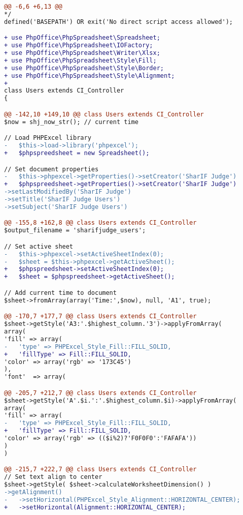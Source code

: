 \begin{lstlisting}[language=diff, basicstyle=\ttfamily, frame=single,
columns=fullflexible, keepspaces=true, breaklines=true]
@@ -6,6 +6,13 @@
*/
defined('BASEPATH') OR exit('No direct script access allowed');

+ use PhpOffice\PhpSpreadsheet\Spreadsheet;
+ use PhpOffice\PhpSpreadsheet\IOFactory;
+ use PhpOffice\PhpSpreadsheet\Writer\Xlsx;
+ use PhpOffice\PhpSpreadsheet\Style\Fill;
+ use PhpOffice\PhpSpreadsheet\Style\Border;
+ use PhpOffice\PhpSpreadsheet\Style\Alignment;
+ 
class Users extends CI_Controller
{

@@ -142,10 +149,10 @@ class Users extends CI_Controller
$now = shj_now_str(); // current time

// Load PHPExcel library
-   $this->load->library('phpexcel');
+   $phpspreedsheet = new Spreadsheet();

// Set document properties
-   $this->phpexcel->getProperties()->setCreator('SharIF Judge')
+   $phpspreedsheet->getProperties()->setCreator('SharIF Judge')
->setLastModifiedBy('SharIF Judge')
->setTitle('SharIF Judge Users')
->setSubject('SharIF Judge Users')

@@ -155,8 +162,8 @@ class Users extends CI_Controller
$output_filename = 'sharifjudge_users';

// Set active sheet
-   $this->phpexcel->setActiveSheetIndex(0);
-   $sheet = $this->phpexcel->getActiveSheet();
+   $phpspreedsheet->setActiveSheetIndex(0);
+   $sheet = $phpspreedsheet->getActiveSheet();

// Add current time to document
$sheet->fromArray(array('Time:',$now), null, 'A1', true);

@@ -170,7 +177,7 @@ class Users extends CI_Controller
$sheet->getStyle('A3:'.$highest_column.'3')->applyFromArray(
array(
'fill' => array(
-   'type' => PHPExcel_Style_Fill::FILL_SOLID,
+   'fillType' => Fill::FILL_SOLID,
'color' => array('rgb' => '173C45')
),
'font'  => array(

@@ -205,7 +212,7 @@ class Users extends CI_Controller
$sheet->getStyle('A'.$i.':'.$highest_column.$i)->applyFromArray(
array(
'fill' => array(
-   'type' => PHPExcel_Style_Fill::FILL_SOLID,
+   'fillType' => Fill::FILL_SOLID,
'color' => array('rgb' => (($i%2)?'F0F0F0':'FAFAFA'))
)
)

@@ -215,7 +222,7 @@ class Users extends CI_Controller
// Set text align to center
$sheet->getStyle( $sheet->calculateWorksheetDimension() )
->getAlignment()
-   ->setHorizontal(PHPExcel_Style_Alignment::HORIZONTAL_CENTER);
+   ->setHorizontal(Alignment::HORIZONTAL_CENTER);


\end{lstlisting}
